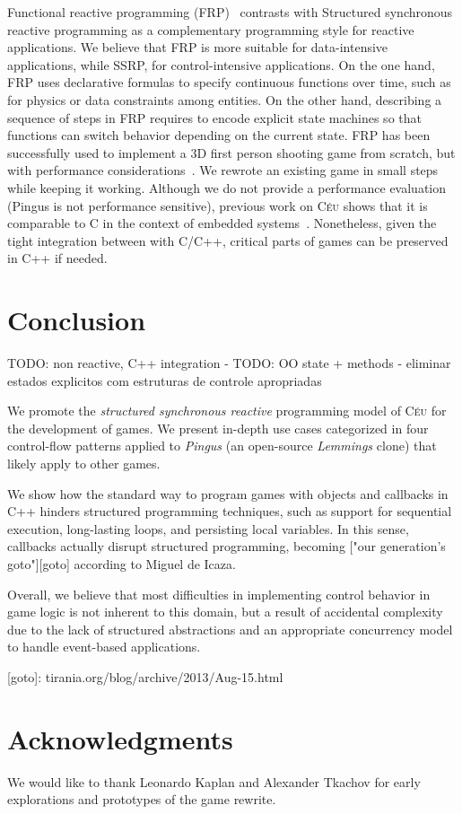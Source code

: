 \documentclass{vgtc}                          %
\newcommand{\CEU}{\textsc{C\'{e}u}\xspace}
\begin{document}
Functional reactive programming (FRP)~\cite{frp.fran} contrasts with
Structured synchronous reactive programming as a complementary programming
style for reactive applications.
%
We believe that FRP is more suitable for data-intensive applications, while 
SSRP, for control-intensive applications.
%
On the one hand, FRP uses declarative formulas to specify continuous functions 
over time, such as for physics or data constraints among entities.
%
On the other hand, describing a sequence of steps in FRP requires to encode 
explicit state machines so that functions can switch behavior depending on the 
current state.
%
FRP has been successfully used to implement a 3D first person shooting game
from scratch, but with performance considerations~\cite{games.frag}.
%
We rewrote an existing game in small steps while keeping it working.
Although we do not provide a performance evaluation (Pingus is not performance
sensitive), previous work on \CEU shows that it is comparable to C in the
context of embedded systems~\cite{ceu.sensys13}.
Nonetheless, given the tight integration between with C/C++, critical parts of
games can be preserved in C++ if needed.

\section{Conclusion}
\label{sec.conclusion}

TODO: non reactive, C++ integration
- TODO: OO state + methods
- eliminar estados explicitos com estruturas de controle apropriadas

We promote the \emph{structured synchronous reactive} programming model of
\CEU for the development of games.
We present in-depth use cases categorized in four control-flow patterns applied
to \emph{Pingus} (an open-source \emph{Lemmings} clone) that likely apply to
other games.

We show how the standard way to program games with objects and callbacks in C++
hinders structured programming techniques, such as support for sequential
execution, long-lasting loops, and persisting local variables.
In this sense, callbacks actually disrupt structured programming, becoming
["our generation’s goto"][goto] according to Miguel de Icaza.

Overall, we believe that most difficulties in implementing control behavior in 
game logic is not inherent to this domain, but a result of accidental
complexity due to the lack of structured abstractions and an appropriate
concurrency model to handle event-based applications.

[goto]: tirania.org/blog/archive/2013/Aug-15.html

\section{Acknowledgments}

We would like to thank Leonardo Kaplan and Alexander Tkachov for early
explorations and prototypes of the game rewrite.



\end{document}
